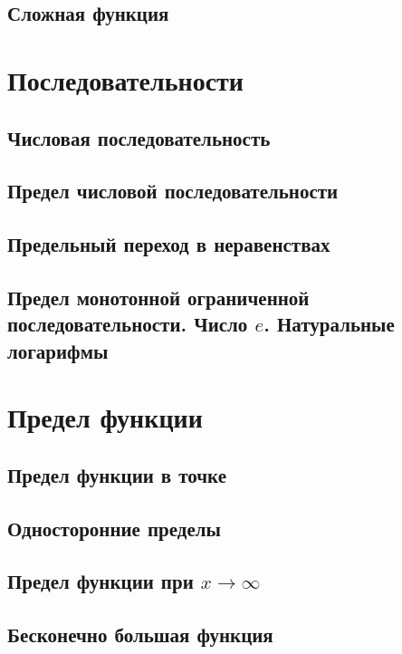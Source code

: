 \documentclass[14pt]{extreport}
\begin{document}
\section{Сложная функция}



\chapter{Последовательности}

\section{Числовая последовательность}

\section{Предел числовой последовательности}

\section{Предельный переход в неравенствах}

\section{Предел монотонной ограниченной последовательности. Число $e$. Натуральные логарифмы}



\chapter{Предел функции}

\section{Предел функции в точке}

\section{Односторонние пределы}

\section{Предел функции при $x\to\infty$}

\section{Бесконечно большая функция}
\end{document}
